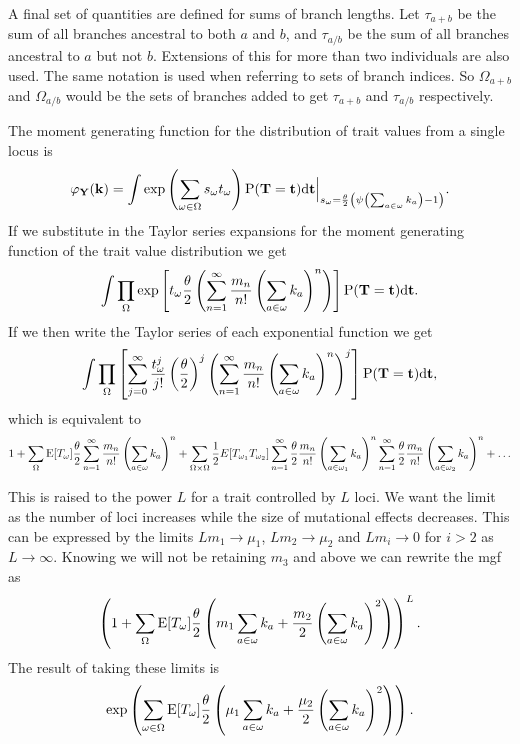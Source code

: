 A final set of quantities are defined for sums of branch lengths. Let
$\tau_{a+b}$ be the sum of all branches ancestral to both $a$ and $b$, and
$\tau_{a/b}$ be the sum of all branches ancestral to $a$ but not $b$. Extensions
of this for more than two individuals are also used. The same notation is used
when referring to sets of branch indices. So $\Omega_{a+b}$ and $\Omega_{a/b}$
would be the sets of branches added to get $\tau_{a+b}$ and $\tau_{a/b}$
respectively.

The moment generating function for the distribution of trait values from a
single locus is
\begin{equation*}
  \varphi_{\mathbf{Y}}(\mathbf{k}) = \int \exp \left( \sum_{\omega \in \Omega} s_{\omega}t_{\omega} \right)
  \mathrm{P}(\mathbf{T}=\mathbf{t})\mathrm{d}\mathbf{t}
  \Bigr|_{s_{\omega}=\frac{\theta}{2} \left( \psi\left(\sum_{a \in \omega}k_{a}\right) -1 \right)}.
\end{equation*}
If we substitute in the Taylor series expansions for the moment generating
function of the trait value distribution we get
\begin{equation*}
  \int \prod_{\Omega} \exp\left[ t_{\omega} \frac{\theta}{2} \left( \sum_{n=1}^{\infty} \frac{m_n}{n!}
    \left( \sum_{a \in \omega} k_a \right)^n \right) \right]
  \mathrm{P}(\mathbf{T} = \mathbf{t}) \mathrm{d}\mathbf{t}.
\end{equation*}
If we then write the Taylor series of each exponential function we get
\begin{equation*}
  \int \prod_{\Omega} \left[ \sum_{j=0}^\infty \frac{t_{\omega}^j}{j!}
  \left( \frac{\theta}{2} \right)^j \left( \sum_{n=1}^{\infty} \frac{m_n}{n!}
  \left( \sum_{a \in \omega} k_a \right)^n \right)^j \right]
  \mathrm{P}(\mathbf{T} = \mathbf{t}) \mathrm{d}\mathbf{t},
\end{equation*}
which is equivalent to
\begin{equation*}
  1 + \sum_{\Omega} \mathrm{E}[T_\omega] \frac{\theta}{2} \sum_{n=1}^{\infty} \frac{m_n}{n!} \left(
  \sum_{a \in \omega} k_a \right)^n +
  \sum_{\Omega \times \Omega} \frac{1}{2} E[T_{\omega_1}T_{\omega_2}]
  \sum_{n=1}^{\infty} \frac{\theta}{2} \frac{m_n}{n!} \left(\sum_{a \in \omega_1} k_a \right)^n
  \sum_{n=1}^{\infty} \frac{\theta}{2} \frac{m_n}{n!} \left(\sum_{a \in \omega_2} k_a \right)^n + \ldots
\end{equation*}

This is raised to the power $L$ for a trait controlled by $L$ loci. We want the
limit as the number of loci increases while the size of mutational effects
decreases. This can be expressed by the limits $L m_1 \to \mu_1$, $L m_2\to
\mu_2$ and $L m_i\to 0$ for $i>2$ as $L \to \infty$. Knowing we will not be
retaining $m_3$ and above we can rewrite the mgf as
\begin{equation*}
  \left(1 + \sum_{\Omega} \mathrm{E}[T_\omega] \frac{\theta}{2} \left(m_1 \sum_{a \in \omega} k_a +
  \frac{m_2}{2} \left(\sum_{a \in \omega} k_a \right)^2\right)\right)^L.
\end{equation*}
The result of taking these limits is
\begin{equation}
  \label{eq:norm_mgf}
  \exp \left( \sum_{\omega \in \Omega}\mathrm{E}[T_{\omega}] \frac{\theta}{2} \left( \mu_1 
  \sum_{a \in \omega} k_a + \frac{\mu_2}{2}\left( \sum_{a \in \omega}
  k_a\right)^2\right)\right).
\end{equation}

